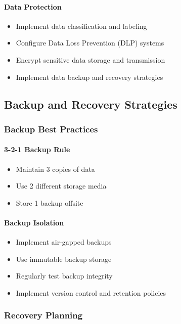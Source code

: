 \documentclass[12pt,a4paper]{article}
\begin{document}
\paragraph{Data Protection}
\begin{itemize}
    \item Implement data classification and labeling
    \item Configure Data Loss Prevention (DLP) systems
    \item Encrypt sensitive data storage and transmission
    \item Implement data backup and recovery strategies
\end{itemize}

\subsection{Backup and Recovery Strategies}

\subsubsection{Backup Best Practices}

\paragraph{3-2-1 Backup Rule}
\begin{itemize}
    \item Maintain 3 copies of data
    \item Use 2 different storage media
    \item Store 1 backup offsite
\end{itemize}

\paragraph{Backup Isolation}
\begin{itemize}
    \item Implement air-gapped backups
    \item Use immutable backup storage
    \item Regularly test backup integrity
    \item Implement version control and retention policies
\end{itemize}

\subsubsection{Recovery Planning}
\end{document}
